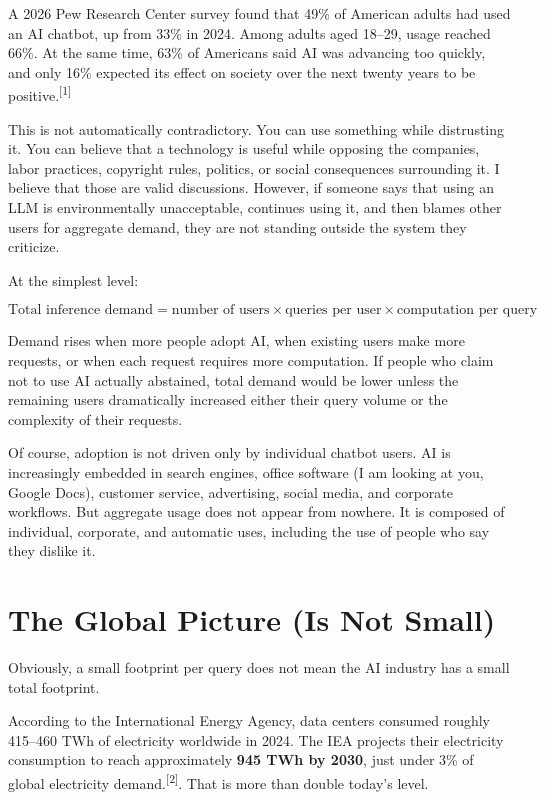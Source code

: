 \documentclass{article}
\begin{document}
A 2026 Pew Research Center survey found that 49\% of American adults had used an AI chatbot, up from 33\% in 2024. Among adults aged 18--29, usage reached 66\%. At the same time, 63\% of Americans said AI was advancing too quickly, and only 16\% expected its effect on society over the next twenty years to be positive.\textsuperscript{[1]}

This is not automatically contradictory. You can use something while distrusting it. You can believe that a technology is useful while opposing the companies, labor practices, copyright rules, politics, or social consequences surrounding it. I believe that those are valid discussions. However, if someone says that using an LLM is environmentally unacceptable, continues using it, and then blames other users for aggregate demand, they are not standing outside the system they criticize.

At the simplest level:

\[
\text{Total inference demand}
=
\text{number of users}
\times
\text{queries per user}
\times
\text{computation per query}
\]

Demand rises when more people adopt AI, when existing users make more requests, or when each request requires more computation. If people who claim not to use AI actually abstained, total demand would be lower unless the remaining users dramatically increased either their query volume or the complexity of their requests.

Of course, adoption is not driven only by individual chatbot users. AI is increasingly embedded in search engines, office software (I am looking at you, Google Docs), customer service, advertising, social media, and corporate workflows. But aggregate usage does not appear from nowhere. It is composed of individual, corporate, and automatic uses, including the use of people who say they dislike it.

\section*{The Global Picture (Is Not Small)}

Obviously, a small footprint per query does not mean the AI industry has a small total footprint.

According to the International Energy Agency, data centers consumed roughly 415--460 TWh of electricity worldwide in 2024. The IEA projects their electricity consumption to reach approximately \textbf{945 TWh by 2030}, just under 3\% of global electricity demand.\textsuperscript{[2]}. That is more than double today's level.
\end{document}
